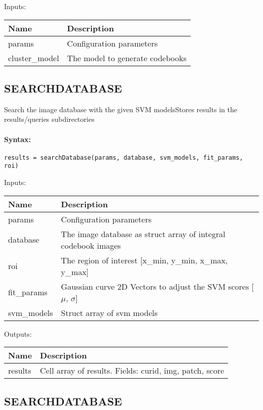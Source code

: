 \bigskip
Inputs:

\begin{tabular}{|p{}|p{}|}
\hline
\textbf{Name} & \textbf{Description} \\
\hline \hline
params & Configuration parameters  \\ \hline
cluster\_model & The model to generate codebooks  \\ \hline
\end{tabular}


\subsection{SEARCHDATABASE}

Search the image database with the given SVM modelsStores results in the results/queries subdirectories

\paragraph{Syntax:} \verb|results = searchDatabase(params, database, svm_models, fit_params, roi)|

\bigskip
Inputs:

\begin{tabular}{|p{}|p{}|}
\hline
\textbf{Name} & \textbf{Description} \\
\hline \hline
params & Configuration parameters  \\ \hline
database & The image database as struct array of integral codebook images  \\ \hline
roi & The region of interest [x\_{min}, y\_{min}, x\_{max}, y\_{max}]  \\ \hline
fit\_params & Gaussian curve 2D Vectors to adjust the SVM scores [$\mu$, $\sigma$]  \\ \hline
svm\_models & Struct array of svm models  \\ \hline
\end{tabular}

\bigskip
Outputs:

\begin{tabular}{|p{}|p{}|}
\hline
\textbf{Name} & \textbf{Description} \\
\hline \hline
results & Cell array of results. Fields: curid, img, patch, score  \\ \hline
\end{tabular}

\subsection{SEARCHDATABASE}

